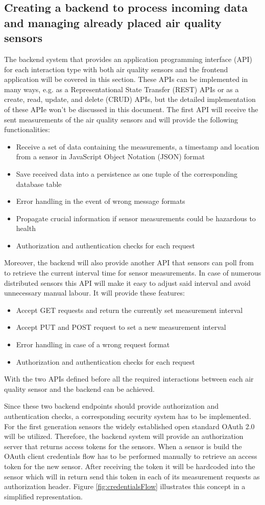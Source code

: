 \documentclass[conference]{IEEEtran}
\begin{document}
\subsection{Creating a backend to process incoming data and managing already placed air quality sensors}
The backend system that provides an application programming interface (API) for each interaction type with both air quality sensors and the frontend application will be covered in this section. These APIs can be implemented in many ways, e.g. as a Representational State Transfer (REST) APIs or as a create, read, update, and delete (CRUD) APIs, but the detailed implementation of these APIe won’t be discussed in this document. The first API will receive the sent measurements of the air quality sensors and will provide the following functionalities:
\begin{itemize}
\item Receive a set of data containing the measurements, a timestamp and location from a sensor in JavaScript Object Notation (JSON) format
\item Save received data into a persistence as one tuple of the corresponding database table
\item Error handling in the event of wrong message formats
\item Propagate crucial information if sensor measurements could be hazardous to health
\item Authorization and authentication checks for each request
\end{itemize}
Moreover, the backend will also provide another API that sensors can poll from to retrieve the current interval time for sensor measurements. In case of numerous distributed sensors this API will make it easy to adjust said interval and avoid unnecessary manual labour. It will provide these features:
\begin{itemize}
\item Accept GET requests and return the currently set measurement interval
\item Accept PUT and POST request to set a new measurement interval
\item Error handling in case of a wrong request format
\item Authorization and authentication checks for each request
\end{itemize}
With the two APIs defined before all the required interactions between each air quality sensor and the backend can be achieved.

Since these two backend endpoints should provide authorization and authentication checks, a corresponding security system has to be implemented. For the first generation sensors the widely established open standard OAuth 2.0 will be utilized. Therefore, the backend system will provide an authorization server that returns access tokens for the sensors. When a sensor is build the OAuth client credentials flow has to be performed manually to retrieve an access token for the new sensor. After receiving the token it will be hardcoded into the sensor which will in return send this token in each of its measurement requests as authorization header. Figure \ref{fig:credentialsFlow} illustrates this concept in a simplified representation.
\end{document}
